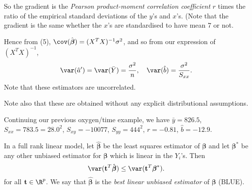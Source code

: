 \documentclass[a4paper]{article}
\begin{document}
So the gradient is the \emph{Pearson product-moment correlation coefficient} $r$ times the ratio of the empirical standard deviations of the $y$'s and $x$'s. (Note that the gradient is the same whether the $x$'s are standardised to have mean 7 or not.

Hence from (5), $\cov(\hat{\boldsymbol\beta}) = (X^TX)^{-1}\sigma^2$, and so from our expression of $(X^TX)^{-1}$,
\[
  \var(\hat{a}') = \var (\bar Y) = \frac{\sigma^2}{n}, \quad\var(\hat{b}) = \frac{\sigma^2}{S_{xx}}.
\]
Note that these estimators are uncorrelated.

Note also that these are obtained without any explicit distributional assumptions.

\begin{eg}
  Continuing our previous oxygen/time example, we have $\bar y = 826.5$, $S_{xx} = 783.5 = 28.0^2$, $S_{xy} = -10077$, $S_{yy} = 444^2$, $r = -0.81$, $\hat b = -12.9$.
\end{eg}

\begin{thm}
  In a full rank linear model, let $\hat{\boldsymbol\beta}$ be the least squares estimator of $\boldsymbol\beta$ and let $\boldsymbol\beta^*$ be any other unbiased estimator for $\boldsymbol\beta$ which is linear in the $Y_i$'s. Then
  \[
    \var(\mathbf{t}^T\hat{\boldsymbol\beta}) \leq \var (\mathbf{t}^T\boldsymbol\beta^*).
  \]
  for all $\mathbf{t}\in \R^p$. We say that $\hat{\boldsymbol\beta}$ is the \emph{best linear unbiased estimator} of $\boldsymbol\beta$ (BLUE).
\end{thm}
\end{document}
